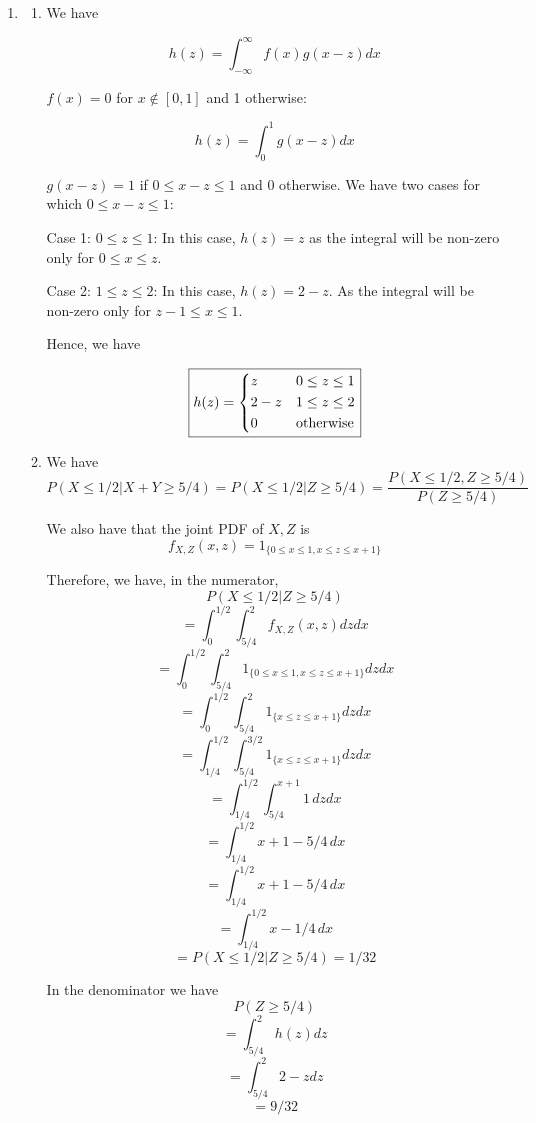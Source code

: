 \documentclass[submit]{harvardml}
\begin{document}
\begin{enumerate}
\begin{enumerate}
    \item
    \begin{enumerate}
      \item 
      We have 
      
      $$h(z) = \int_{-\infty}^{\infty} f(x)g(x-z)dx$$

      $f(x) = 0$ for $x \notin [0,1]$ and 1 otherwise:

      $$h(z) = \int_{0}^{1} g(x-z)dx$$

      $g(x-z) = 1$ if $0 \leq x-z \leq 1$ and 0 otherwise. We have two cases for which 
      $0 \leq x-z \leq 1$: 

      Case 1: $0\leq z\leq 1$: In this case, $h(z) = z$ as the integral will be non-zero only 
      for $0\leq x\leq z$.

      Case 2: $1\leq z\leq 2$: In this case, $h(z) = 2-z$. As the integral will be non-zero only for
      $z-1\leq x\leq 1$.

      Hence, we have

      $$
      \boxed{
      h(z) =
      \begin{dcases} 
        z & 0\leq z\leq 1 \\
        2-z & 1\leq z\leq 2\\
        0 & \textnormal{otherwise}
      \end{dcases}
      }
      $$

      \item
      We have
      $$P(X\leq 1/2 | X + Y \geq 5/4) = P(X\leq 1/2 | Z\geq 5/4)
        = \frac{P(X\leq 1/2, Z \geq 5/4)}{P(Z \geq 5/4)}$$
      
      We also have that the joint PDF of $X,Z$ is 
      $$f_{X,Z}(x,z)=1_{\{0\leq x\leq 1, x\leq z\leq x+1\}}$$

      Therefore, we have, in the numerator,
      $$P(X\leq 1/2 | Z\geq 5/4)$$
      $$=\int_0^{1/2} \int_{5/4}^2 f_{X,Z} (x,z) dz dx$$
      $$=\int_0^{1/2} \int_{5/4}^2 1_{\{0\leq x\leq 1, x\leq z\leq x+1\}} dz dx$$
      $$=\int_0^{1/2} \int_{5/4}^2 1_{\{x\leq z\leq x+1\}} dz dx$$
      $$=\int_{1/4}^{1/2} \int_{5/4}^{3/2} 1_{\{x\leq z\leq x+1\}} dz dx$$
      $$=\int_{1/4}^{1/2} \int_{5/4}^{x+1} 1\, dz dx$$
      $$=\int_{1/4}^{1/2} x + 1 - 5/4\, dx$$
      $$=\int_{1/4}^{1/2} x + 1 - 5/4\, dx$$
      $$=\int_{1/4}^{1/2} x - 1/4\, dx$$
      $$=P(X\leq 1/2 | Z\geq 5/4)=1/32$$

      In the denominator we have
      $$P(Z \geq 5/4)$$
      $$=\int_{5/4}^2 h(z) dz$$
      $$=\int_{5/4}^2 2-z dz$$
      $$=9/32$$


\end{enumerate}
\end{enumerate}
\end{enumerate}
\end{document}
